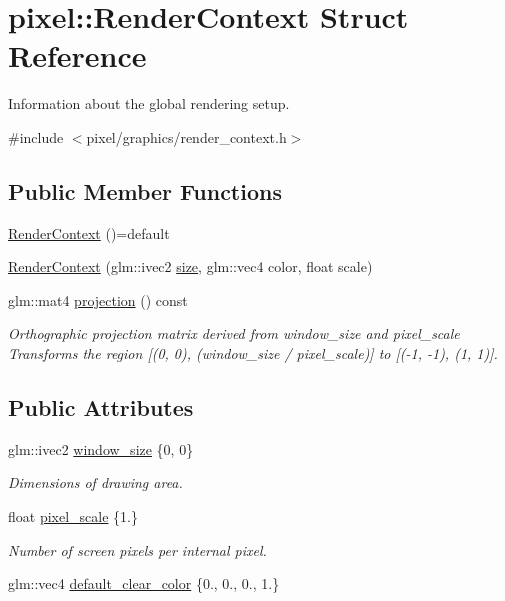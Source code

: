 \hypertarget{structpixel_1_1_render_context}{}\section{pixel\+:\+:Render\+Context Struct Reference}
\label{structpixel_1_1_render_context}


Information about the global rendering setup.  




{\ttfamily \#include $<$pixel/graphics/render\+\_\+context.\+h$>$}

\subsection*{Public Member Functions}
\begin{DoxyCompactItemize}
\item 
\hyperlink{structpixel_1_1_render_context_ae08ab393a489732b6a0c38fa50adae56}{Render\+Context} ()=default
\item 
\hyperlink{structpixel_1_1_render_context_a8444032f302469f5fb925b9b6e2078c3}{Render\+Context} (glm\+::ivec2 \hyperlink{namespacepixel_a465745e3b1a334686475c629948876f0}{size}, glm\+::vec4 color, float scale)
\item 
glm\+::mat4 \hyperlink{structpixel_1_1_render_context_a337152d3d3362d25ef7b0ddab3cddd41}{projection} () const
\begin{DoxyCompactList}\small\item\em Orthographic projection matrix derived from {\ttfamily window\+\_\+size} and {\ttfamily pixel\+\_\+scale} Transforms the region \mbox{[}(0, 0), (window\+\_\+size / pixel\+\_\+scale)\mbox{]} to \mbox{[}(-\/1, -\/1), (1, 1)\mbox{]}. \end{DoxyCompactList}\end{DoxyCompactItemize}
\subsection*{Public Attributes}
\begin{DoxyCompactItemize}
\item 
glm\+::ivec2 \hyperlink{structpixel_1_1_render_context_aca15b0c7467b431a824c5adaf8286fbb}{window\+\_\+size} \{0, 0\}
\begin{DoxyCompactList}\small\item\em Dimensions of drawing area. \end{DoxyCompactList}\item 
float \hyperlink{structpixel_1_1_render_context_aa69e9ab9ae6832885d8c4390e95d810a}{pixel\+\_\+scale} \{1.\}
\begin{DoxyCompactList}\small\item\em Number of screen pixels per internal pixel. \end{DoxyCompactList}\item 
glm\+::vec4 \hyperlink{structpixel_1_1_render_context_aafda602522210ff2cd46ff0cb8ec6396}{default\+\_\+clear\+\_\+color} \{0., 0., 0., 1.\}
\end{DoxyCompactItemize}


